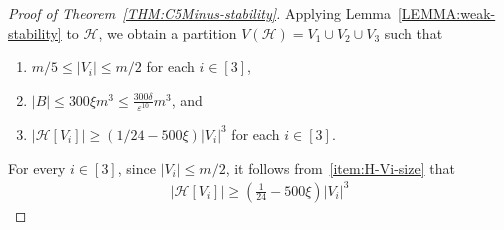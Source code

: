 \documentclass[11pt,a4paper]{article}
\newtheorem{claim}[definition]{Claim}
\theoremstyle{remark}
\begin{document}
\begin{proof}[Proof of Theorem~\ref{THM:C5Minus-stability}]
    Applying Lemma~\ref{LEMMA:weak-stability} to $\mathcal{H}$, we obtain a partition $V(\mathcal{H}) = V_1 \cup V_2 \cup V_3$ such that 
    \begin{enumerate}[label=(\roman*)]
        \item\label{item:Vi-size} $m/5\le |V_i|\le m/2$ for each $i \in [3]$, 
        \item\label{item:B-size} $|B| \le 300 \xi m^3 \le \frac{300\delta}{\varepsilon^{10}} m^3$, and  
        \item\label{item:H-Vi-size} $|\mathcal{H}[V_i]| \ge (1/24 - 500\xi) |V_i|^3$ for each $i \in [3]$.
    \end{enumerate}
    For every $i \in [3]$, since $|V_i| \le m/2$, it follows from~\ref{item:H-Vi-size} that 
    \begin{align*}
        |\mathcal{H}[V_i]| 
        \ge \left(\frac{1}{24} - 500\xi \right) |V_i|^3

\end{align*}
\end{proof}
\end{document}
